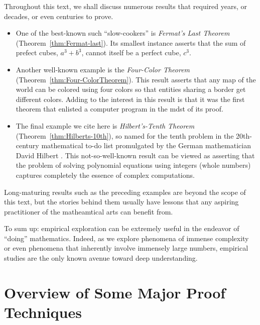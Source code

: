 Throughout this text, we shall discuss numerous results that required
years, or decades, or even centuries to prove.
\begin{itemize}
\item
One of the best-known such ``slow-cookers'' is {\it Fermat's Last
  Theorem} (Theorem~\ref{thm:Fermat-last}).  Its smallest instance
asserts that the sum of prefect cubes, $a^3 + b^3$, cannot itself be a
perfect cube, $c^3$.
\item
Another well-known example is the {\it Four-Color Theorem}
(Theorem~\ref{thm:Four-ColorTheorem}).  This result asserts that any
map of the world can be colored using four colors so that entities
sharing a border get different colors.  Adding to the interest in this
result is that it was the first theorem that enlisted a computer
program in the mdst of its proof.
\item
The final example we cite here is {\it Hilbert's-Tenth Theorem}
(Theorem~\ref{thm:Hilberts-10th}), so named for the tenth problem in
 the 20th-century mathematical to-do
list promulgated by the German mathematician David Hilbert
.  This not-so-well-known result can be viewed
as asserting that the problem of solving polynomial equations using
integers (whole numbers) captures completely the essence of complex
computations.
\end{itemize}
Long-maturing results such as the preceding examples are beyond the
scope of this text, but the stories behind them usually have lessons
that any aspiring practitioner of the matheamtical arts can benefit
from.

To sum up: empirical exploration can be extremely useful in the
endeavor of ``doing'' mathematics.  Indeed, as we explore phenomena of
immense complexity or even phenomena that inherently involve immensely
large numbers, empirical studies are the only known avenue toward deep
understanding.


 


\section{Overview of Some Major Proof Techniques}
\label{sec:major-proof-techniques}

